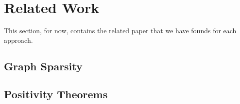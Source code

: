 \section{Related Work}

This section, for now, contains the related paper that we have founds for each approach.


\subsection{Graph Sparsity}


\subsection{Positivity Theorems}
